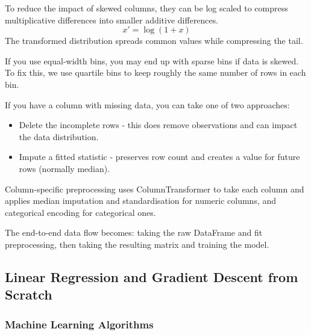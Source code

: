 To reduce the impact of skewed columns, they can be log scaled to compress multiplicative differences into smaller additive differences.
\begin{equation}
    x' = \log(1+x)
\end{equation}
The transformed distribution spreads common values while compressing the tail.

If you use equal-width bins, you may end up with sparse bins if data is skewed.
To fix this, we use quartile bins to keep roughly the same number of rows in each bin.


If you have a column with missing data, you can take one of two approaches:
\begin{itemize}
    \item Delete the incomplete rows - this does remove observations and can impact the data distribution.
    \item Impute a fitted statistic - preserves row count and creates a value for future rows (normally median).
\end{itemize}

Column-specific preprocessing uses ColumnTransformer to take each column and applies median imputation and standardisation for numeric columns, and categorical encoding for categorical ones.

The end-to-end data flow becomes: taking the raw DataFrame and fit preprocessing, then taking the resulting matrix and training the model.

\subsection{Linear Regression and Gradient Descent from Scratch}

\subsubsection{Machine Learning Algorithms}


